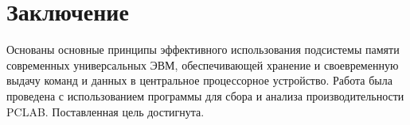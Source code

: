 \chapter{Заключение}

Основаны основные принципы эффективного использования подсистемы памяти современных универсальных ЭВМ, обеспечивающей хранение и своевременную выдачу команд и данных в центральное процессорное
устройство. Работа была проведена с использованием программы для сбора и анализа производительности PCLAB. Поставленная цель достигнута.

